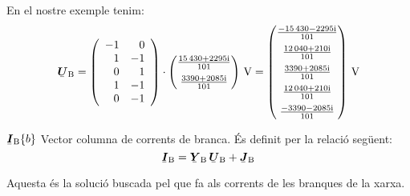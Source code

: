 \begin{list}{}
   En el nostre exemple tenim:
   \[
      \mcmplx{U}\ped{B} =
      \left(\begin{array}{rr} -1 & 0 \\ 1  & -1 \\  0 & 1 \\ 1 & -1 \\ 0 & -1
      \end{array}\right) \cdot
      \begin{pmatrix}
            \frac{\complexnum{15430 + j 2295}}{101} \\[2mm]
            \frac{\complexnum{3390 + j 2085}}{101}
      \end{pmatrix}\,\unit{V} =
      \begin{pmatrix}
           \frac{\complexnum{ -15430 - j 2295}}{101} \\[2mm]
           \frac{\complexnum{12040 + j 210}}{101}  \\[2mm]
           \frac{\complexnum{3390 + j 2085}}{101} \\[2mm]
           \frac{\complexnum{ 12040 + j 210}}{101}  \\[2mm]
           \frac{\complexnum{ -3390 - j 2085}}{101}
      \end{pmatrix}\,\unit{V}
   \]

   \item[$\mcmplx{I}\ped{B}\{b\}$]  Vector columna de corrents de branca. És definit per la relació següent:
   \begin{equation}
      \mcmplx{I}\ped{B} = \mcmplx{Y}\ped{B} \,\mcmplx{U}\ped{B} + \mcmplx{J}\ped{B} \label{eq:ir}
   \end{equation}

   Aquesta és la solució buscada pel que fa als corrents de les branques de la xarxa.


\end{list}
